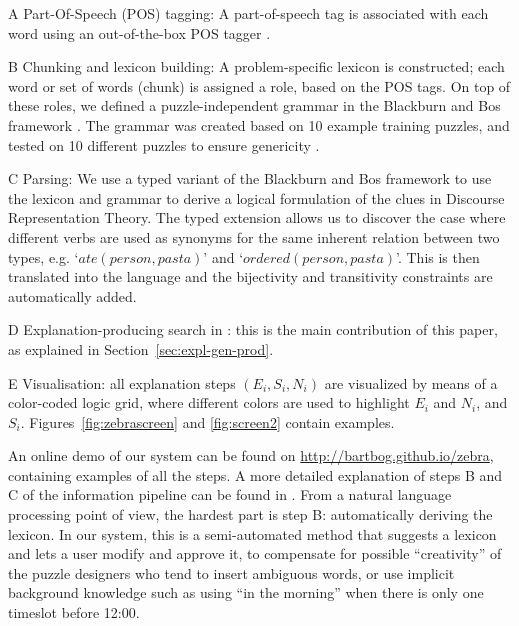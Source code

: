 \begin{compactenum}
	\item[A] Part-Of-Speech (POS) tagging: A part-of-speech tag is associated with each word using an out-of-the-box POS tagger \cite{DBLP:journals/coling/MarcusSM94}.
	\item[B] Chunking and lexicon building: A problem-specific lexicon is constructed; each word or set of words (chunk) is assigned a role, based on the POS tags. On top of these roles, we defined a puzzle-independent grammar in the Blackburn and Bos framework \cite{Blackburn2005,Blackburn2006}. The grammar was created based on 10 example training puzzles, and tested on 10 different puzzles to ensure genericity \cite{msc/Claes17}. 
	\item[C] Parsing: We use a typed variant of the Blackburn and Bos framework to use the lexicon and grammar to derive a logical formulation of the clues in Discourse Representation Theory. The typed extension allows us to discover the case where different verbs are used as synonyms for the same inherent relation between two types, e.g. `$ate(person, pasta)$' and `$ordered(person, pasta)$'. This is then translated into the \idp language and the bijectivity and transitivity constraints are automatically added. 
	\item[D] Explanation-producing search in \idp: this is the main contribution of this paper, as explained in Section~\ref{sec:expl-gen-prod}.
	\item[E] Visualisation: all  explanation steps $(E_i, S_i, N_i)$ are visualized by means of a color-coded logic grid, where different colors are used to highlight $E_i$ and $N_i$, and $S_i$. Figures~\ref{fig:zebrascreen} and \ref{fig:screen2} contain examples.
\end{compactenum}

\noindent
 An online demo of our system can be found on \url{http://bartbog.github.io/zebra}, containing examples of all the steps. 
% 
A more detailed explanation of steps B and C of the information pipeline can be found in \cite{msc/Claes17}. From a natural language processing point of view, the hardest part is step B: automatically deriving the lexicon. In our system, this is a semi-automated method that suggests a lexicon and lets a user modify and approve it, to compensate for possible ``creativity'' of the puzzle designers who tend to insert ambiguous words, or use implicit background knowledge such as using ``in the morning'' when there is only one timeslot before 12:00.
